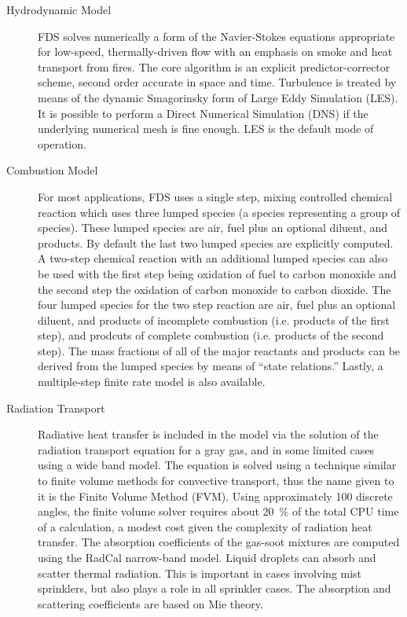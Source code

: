 \documentclass[11pt]{book}
\begin{document}
\begin{description}
\item[Hydrodynamic Model]
FDS solves numerically a form of the Navier-Stokes equations appropriate
for low-speed, thermally-driven flow with an emphasis on
smoke and heat transport from fires. The core algorithm is an
explicit predictor-corrector scheme, second order accurate in space
and time. Turbulence is treated by means of the dynamic Smagorinsky form of
Large Eddy Simulation (LES). It is possible to perform a Direct
Numerical Simulation (DNS) if the underlying numerical mesh is fine
enough. LES is the default mode of operation.

\item[Combustion Model]
For most applications, FDS uses a single step, mixing controlled chemical reaction which uses three lumped species (a species representing a group of species).  These lumped species are air, fuel plus an optional diluent, and products. By default the last two lumped species are explicitly
computed. A two-step chemical reaction with an additional lumped species can also be used with the first step being oxidation of fuel to carbon monoxide and the second step the oxidation of carbon monoxide to carbon dioxide.
The four lumped species for the two step reaction are air, fuel plus an optional diluent, and products of incomplete combustion (i.e. products of the first step), and prodcuts of complete combustion (i.e. products of the second step).  The mass fractions of all of the major
reactants and products can be derived from the lumped species by means of
``state relations.''  Lastly, a multiple-step finite rate model is also available.

\item[Radiation Transport] Radiative heat transfer is included in the
model via the solution of the radiation transport equation for a
gray gas, and in some limited cases using a wide band
model.  The equation is solved using a technique similar to finite
volume methods for convective transport, thus the name given to it is
the Finite Volume Method (FVM).  Using approximately 100 discrete
angles, the finite volume solver requires about 20~\% of the total CPU
time of a calculation, a modest cost given the complexity of radiation
heat transfer. The absorption coefficients of the gas-soot mixtures
are computed using the RadCal narrow-band model.  Liquid droplets can
absorb and scatter thermal radiation. This is important in cases
involving mist sprinklers, but also plays a role in all sprinkler
cases.  The absorption and scattering coefficients are based on Mie
theory.


\end{description}
\end{document}
